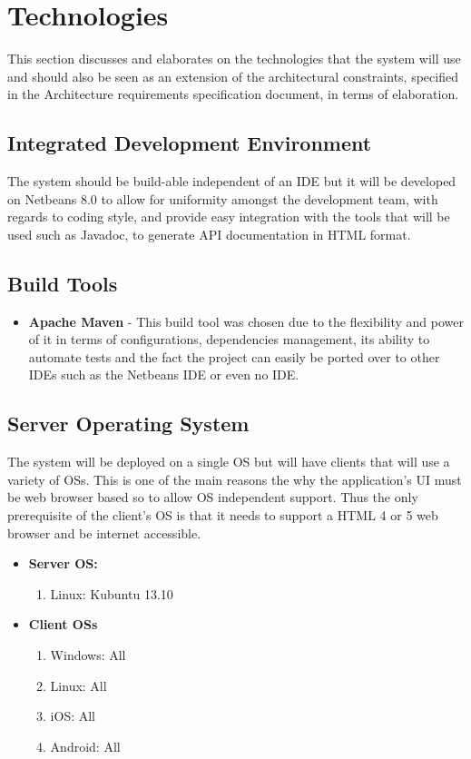 \documentclass[12pt]{article}
\begin{document}
\section{Technologies}
This section discusses and elaborates on the technologies that the system will use and should also be seen as an extension of the architectural constraints, specified in the Architecture requirements specification document, in terms of elaboration.

\subsection{Integrated Development Environment}
The system should be build-able independent of an IDE but it will be developed on Netbeans 8.0 to allow for uniformity amongst the development team, with regards to coding style, and provide easy integration with the tools that will be used such as Javadoc, to generate  API documentation in HTML format.

\subsection{Build Tools}
\begin{itemize}
\item \textbf{Apache Maven} - This build tool was chosen due to the flexibility and power of it in terms of configurations, dependencies management, its ability to automate tests and the fact the project can easily be ported over to other IDEs such as the Netbeans IDE or even no IDE. 
\end{itemize}

\subsection{Server Operating System}

The system will be deployed on a single OS but will have clients that will use a variety of OSs. This is one of the main reasons the why the application's UI must be web browser based so to allow OS independent support. Thus the only prerequisite of the client's OS is that it needs to support a HTML 4 or 5 web browser and be internet accessible.
\begin{itemize}
\item \textbf{Server OS:}
	\begin{enumerate}
		\item Linux: Kubuntu 13.10
	\end{enumerate}
\item \textbf{Client OSs}
	\begin{enumerate}
		\item Windows: All
		\item Linux: All
		\item iOS: All
		\item Android: All
	\end{enumerate}
\end{itemize}
\end{document}
